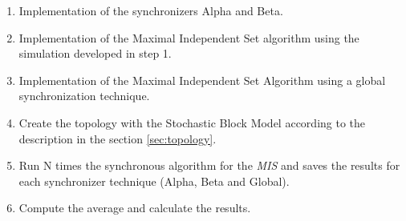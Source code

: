 \begin{enumerate}
\item Implementation of the synchronizers Alpha and Beta.
\item Implementation of the Maximal Independent Set algorithm using the simulation developed in step 1.
\item Implementation of the Maximal Independent Set Algorithm using a global synchronization technique.
\item Create the topology with the Stochastic Block Model according to the description in the section \ref{sec:topology}.
\item Run N times the synchronous algorithm for the \textit{MIS} and saves the results for each synchronizer technique (Alpha, Beta and Global).
\item Compute the average and calculate the results.
\end{enumerate}



